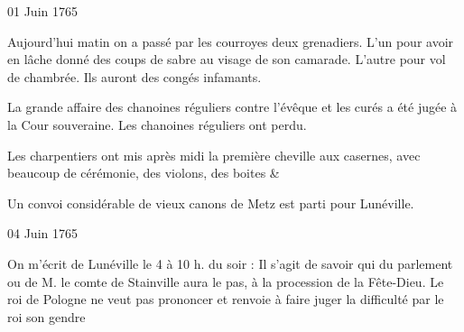                      \begin{diary}{01 Juin 1765}{}

                         Aujourd'hui matin on a passé par les
                           courroyes deux
                              grenadiers. L'un pour avoir
                           en lâche donné des coups de sabre au visage
                           de son camarade. L'autre pour vol de chambrée.
                           Ils auront des congés infamants. \bigskip


                         La grande affaire des chanoines
                              réguliers
                           contre l'évêque et les curés a été jugée à
                           la Cour souveraine. Les chanoines réguliers ont perdu. \bigskip


                         Les charpentiers ont mis après midi la
                           première cheville aux
                              casernes, avec beaucoup
                           de cérémonie, des violons, des boites \& \bigskip


                         Un convoi considérable de vieux
                           canons de
                           Metz est parti pour Lunéville. \bigskip


                     \end{diary}

                     \begin{diary}{04 Juin 1765}{}

                         On m'écrit de Lunéville
                           le 4 à 10 h. du soir :
                           Il s'agit de savoir qui du parlement ou de M.
                              le comte de Stainville aura le pas, à la procession
                           de la Fête-Dieu. Le roi de Pologne ne veut pas
                           prononcer et renvoie à faire juger la difficulté
                           par le roi son gendre
                        \bigskip


                     \end{diary}

